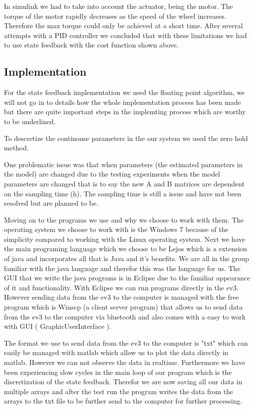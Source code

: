 \documentclass[a4paper]{article}
\begin{document}
In simulink we had to take into account the actuator, being the motor. The torque of the motor rapidly decreases as the speed of the wheel increases. Therefore the max torque could only be achieved at a short time. After several attempts with a PID controller we concluded that with these limitations we had to use state feedback with the cost function shown above.

\subsection{Implementation}



For the state feedback implementation we used  the floating point algorithm, we will not go in to details how the whole implementation process has been made but there are quite important steps in the implemting process which are worthy to be underlined.

To descretize the continouse parameters in the our system we used the zero hold method.

One problematic issue was that when parameters (the estimated parameters in the model) are changed due to the testing experiments when the model parameters are changed that is to say the new A and B matrices are dependent on the sampling time (h). The sampling time is still a issue and have not been resolved but are planned to be.

Moving on to the programs we use and why we choose to work with them. The operating system we choose to work with is the Windows 7 because of the simplicity compared to working with the Linux operating system. Next we have the main programing language which we choose to be Lejos which is a extension of java and incorporates all that is Java and it's benefits. We are all in the group familiar with the java language and therefor this was the language for us. The GUI that we write the java programs is in Eclipse due to the familiar appearance of it and functionality. With Eclipse we can run programs directly in the ev3. However sending data from the ev3 to the computer is managed with the free program which is Winscp (a client server program) that allows us to send data from the ev3 to the computer via bluetooth and also comes with a easy to work with GUI ( GraphicUserInterface ).

The format we use to send data from the ev3 to the computer is "txt" which can easily be managed with matlab which allow us to plot the data directly in matlab. However we can not observe the data in realtime. Furthermore we have been experiencing slow cycles in the main loop of our program which is the discretization of the state feedback. Therefor we are now saving all our data in multiple arrays and after the test run the program writes the data from the arrays to the txt file to be further send to the computer for further processing.  
\end{document}
